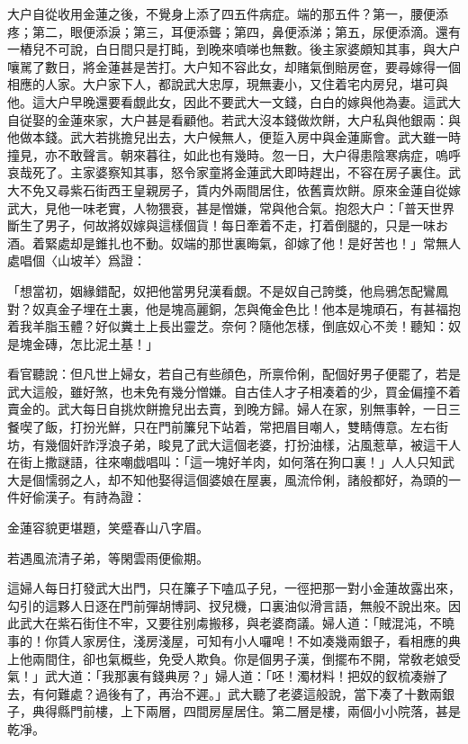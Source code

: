 大户自從收用金蓮之後，不覺身上添了四五件病症。端的那五件？第一，腰便添疼；第二，眼便添淚；第三，耳便添聾；第四，鼻便添涕；第五，尿便添滴。還有一樁兒不可說，白日間只是打盹，到晚來噴㖒也無數。後主家婆頗知其事，與大户嚷駡了數日，將金蓮甚是苦打。大户知不容此女，却賭氣倒賠房奩，要尋嫁得一個相應的人家。大户家下人，都說武大忠厚，現無妻小，又住着宅内房兒，堪可與他。這大户早晚還要看覷此女，因此不要武大一文錢，白白的嫁與他為妻。這武大自従娶的金蓮來家，大户甚是看顧他。若武大沒本錢做炊餅，大户私與他銀兩：與他做本錢。武大若挑擔兒出去，大户候無人，便踅入房中與金蓮廝會。武大雖一時撞見，亦不敢聲言。朝來暮往，如此也有幾時。忽一日，大户得患陰寒病症，嗚呼哀哉死了。主家婆察知其事，怒令家童將金蓮武大即時趕出，不容在房子裏住。武大不免又尋紫石街西王皇親房子，賃内外兩間居住，依舊賣炊餅。原來金蓮自從嫁武大，見他一味老實，人物猥衰，甚是憎嫌，常與他合氣。抱怨大户：「普天世界斷生了男子，何故將奴嫁與這樣個貨！每日牽着不走，打着倒腿的，只是一味お酒。着緊處却是錐扎也不動。奴端的那世裏晦氣，卻嫁了他！是好苦也！」常無人處唱個〈山坡羊〉爲證：

\begin{myquote}
「想當初，姻緣錯配，奴把他當男兒漢看覷。不是奴自己誇獎，他烏鴉怎配鸞鳳對？奴真金子埋在土裏，他是塊高麗銅，怎與俺金色比！他本是塊頑石，有甚福抱着我羊脂玉體？好似糞土上長出靈芝。奈何？隨他怎樣，倒底奴心不羙！聽知：奴是塊金磚，怎比泥土基！」
\end{myquote}

看官聽說：但凡世上婦女，若自己有些顔色，所禀伶俐，配個好男子便罷了，若是武大這般，雖好煞，也未免有幾分憎嫌。自古佳人才子相凑着的少，買金偏撞不着賣金的。武大每日自挑炊餅擔兒出去賣，到晚方歸。婦人在家，别無事幹，一日三餐喫了飯，打扮光鮮，只在門前簾兒下站着，常把眉目嘲人，雙睛傳意。左右街坊，有幾個奸詐浮浪子弟，睃見了武大這個老婆，打扮油樣，沾風惹草，被這干人在街上撒謎語，往來嘲戯唱叫：「這一塊好羊肉，如何落在狗口裏！」人人只知武大是個懦弱之人，却不知他娶得這個婆娘在屋裏，風流伶俐，諸般都好，為頭的一件好偷漢子。有詩為證：

\begin{myquote}
金蓮容貌更堪題，笑蹙春山八字眉。

若遇風流清子弟，等閑雲雨便偸期。
\end{myquote}

這婦人每日打發武大出門，只在簾子下嗑瓜子兒，一徑把那一對小金蓮故露出來，勾引的這夥人日逐在門前彈胡博詞、扠兒機，口裏油似滑言語，無般不說出來。因此武大在紫石街住不牢，又要往别䖏搬移，與老婆商議。婦人道：「賊混沌，不曉事的！你賃人家房住，淺房淺屋，可知有小人囉唣！不如凑幾兩銀子，看相應的典上他兩間住，卻也氣概些，免受人欺負。你是個男子漢，倒擺布不開，常敎老娘受氣！」武大道：「我那裏有錢典房？」婦人道：「呸！濁材料！把奴的釵梳凑辦了去，有何難處？過後有了，再治不遲。」武大聽了老婆這般說，當下凑了十數兩銀子，典得縣門前樓，上下兩層，四間房屋居住。第二層是樓，兩個小小院落，甚是乾凈。

